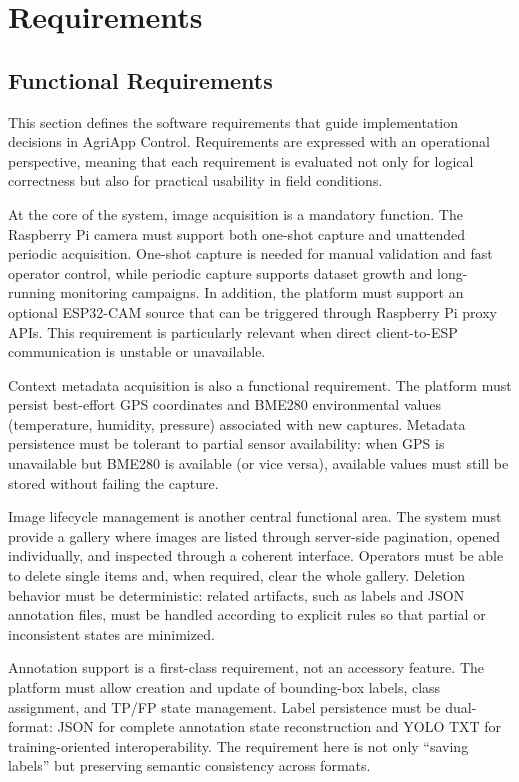 \section{Requirements}

\subsection{Functional Requirements}
This section defines the software requirements that guide implementation decisions in AgriApp Control. Requirements are expressed with an operational perspective, meaning that each requirement is evaluated not only for logical correctness but also for practical usability in field conditions.

At the core of the system, image acquisition is a mandatory function. The Raspberry Pi camera must support both one-shot capture and unattended periodic acquisition. One-shot capture is needed for manual validation and fast operator control, while periodic capture supports dataset growth and long-running monitoring campaigns. In addition, the platform must support an optional ESP32-CAM source that can be triggered through Raspberry Pi proxy APIs. This requirement is particularly relevant when direct client-to-ESP communication is unstable or unavailable.

Context metadata acquisition is also a functional requirement. The platform must persist best-effort GPS coordinates and BME280 environmental values (temperature, humidity, pressure) associated with new captures. Metadata persistence must be tolerant to partial sensor availability: when GPS is unavailable but BME280 is available (or vice versa), available values must still be stored without failing the capture.

Image lifecycle management is another central functional area. The system must provide a gallery where images are listed through server-side pagination, opened individually, and inspected through a coherent interface. Operators must be able to delete single items and, when required, clear the whole gallery. Deletion behavior must be deterministic: related artifacts, such as labels and JSON annotation files, must be handled according to explicit rules so that partial or inconsistent states are minimized.

Annotation support is a first-class requirement, not an accessory feature. The platform must allow creation and update of bounding-box labels, class assignment, and TP/FP state management. Label persistence must be dual-format: JSON for complete annotation state reconstruction and YOLO TXT for training-oriented interoperability. The requirement here is not only ``saving labels'' but preserving semantic consistency across formats.

